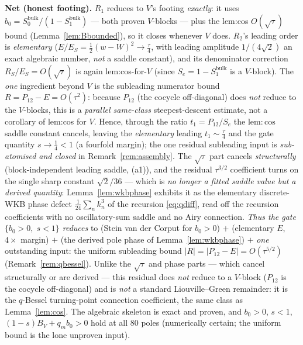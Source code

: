 \begin{remark}
\textbf{Net \textup(honest footing\textup).} $R_1$ reduces to $V$'s footing \emph{exactly}: it uses
$b_0=S_0^{\mathrm{bulk}}/(1-S_1^{\mathrm{bulk}})$ --- both proven $V$-blocks --- plus the lem:cos
$O(\sqrt\tau)$ bound (Lemma~\ref{lem:Bbounded}), so it closes whenever $V$ does. $R_2$'s leading order is
\emph{elementary} ($E/E_S=\tfrac12(w-W)^2\to\tfrac\tau4$, with leading amplitude $1/(4\sqrt2)$ an exact
algebraic number, \emph{not} a saddle constant), and its denominator correction $R_S/E_S=O(\sqrt\tau)$ is
again lem:cos-for-$V$ (since $S_e=1-S_1^{\mathrm{bulk}}$ is a $V$-block). The \emph{one} ingredient beyond
$V$ is the subleading numerator bound $R=P_{12}-E=O(\tau^2)$: because $P_{12}$ (the cocycle off-diagonal)
does \emph{not} reduce to the $V$-blocks, this is a \emph{parallel same-class} steepest-descent estimate,
not a corollary of lem:cos for $V$. Hence, through the ratio $t_1=P_{12}/S_e$ the $\mathrm{lem:cos}$ saddle constant cancels, leaving the
\emph{elementary} leading $t_1\sim\tfrac\tau4$ and the gate quantity $s\to\tfrac14<1$ (a fourfold margin); the
one residual subleading input is \emph{sub-atomised and closed} in Remark~\ref{rem:assembly}. The $\sqrt\tau$
part cancels \emph{structurally} (block-independent leading saddle, (a1)), and the residual $\tau^{3/2}$
coefficient turns on the single sharp constant $\sqrt2/36$ --- which is \emph{no longer a fitted saddle value
but a derived quantity}: Lemma~\ref{lem:wkbphase} exhibits it as the elementary discrete-WKB phase defect
$\tfrac1{24}\sum_n k_n^3$ of the recursion \eqref{eq:qdiff}, read off the recursion coefficients with no
oscillatory-sum saddle and no Airy connection. \emph{Thus the gate $\{b_0>0,\;s<1\}$ reduces} to (Stein van der Corput for $b_0>0$) $+$ (elementary $E$,
$4\times$ margin) $+$ (the derived pole phase of Lemma~\ref{lem:wkbphase}) $+$ \emph{one} outstanding input: the
uniform subleading bound $|R|=|P_{12}-E|=O(\tau^{5/2})$ (Remark~\ref{rem:qbessel}). Unlike the $\sqrt\tau$ and
phase parts --- which cancel structurally or are derived --- this residual does \emph{not} reduce to a $V$-block
($P_{12}$ is the cocycle off-diagonal) and is \emph{not} a standard Liouville--Green remainder: it is the
$q$-Bessel turning-point connection coefficient, the same class as Lemma~\ref{lem:cos}. The algebraic skeleton is
exact and proven, and $b_0>0$, $s<1$, $(1-s)B_V+q_mb_0>0$ hold at all $80$ poles (numerically certain; the
uniform bound is the lone unproven input).
\end{remark}

